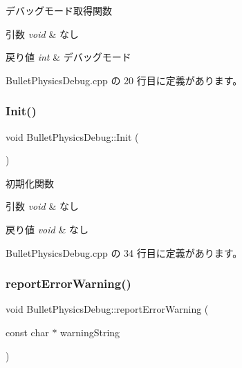 デバッグモード取得関数 


\begin{DoxyParams}{引数}
{\em void} & なし \\
\hline
\end{DoxyParams}

\begin{DoxyRetVals}{戻り値}
{\em int} & デバッグモード \\
\hline
\end{DoxyRetVals}


 Bullet\+Physics\+Debug.\+cpp の 20 行目に定義があります。

\mbox{\label{class_bullet_physics_debug_a1881672318e69c82f3c4f3eee81c0f11}} 
\subsubsection{\texorpdfstring{Init()}{Init()}}
{\footnotesize\ttfamily void Bullet\+Physics\+Debug\+::\+Init (\begin{DoxyParamCaption}{ }\end{DoxyParamCaption})}



初期化関数 


\begin{DoxyParams}{引数}
{\em void} & なし \\
\hline
\end{DoxyParams}

\begin{DoxyRetVals}{戻り値}
{\em void} & なし \\
\hline
\end{DoxyRetVals}


 Bullet\+Physics\+Debug.\+cpp の 34 行目に定義があります。

\mbox{\label{class_bullet_physics_debug_aeec16a6d939beb6afbae9760310ec098}} 
\subsubsection{\texorpdfstring{report\+Error\+Warning()}{reportErrorWarning()}}
{\footnotesize\ttfamily void Bullet\+Physics\+Debug\+::report\+Error\+Warning (\begin{DoxyParamCaption}\item[{const char $\ast$}]{warning\+String }\end{DoxyParamCaption})\hspace{0.3cm}{\ttfamily [override]}}



